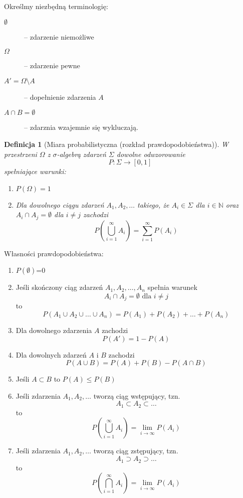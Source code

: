 \documentclass[11pt, leqno]{scrartcl}
\theoremstyle{mydefinition}
\newtheorem{definition}{Definicja}[subsection]
\theoremstyle{mytheorem}
\begin{document}
    Określmy niezbędną terminologię:
    \begin{description}
        \item[$\emptyset$] -- zdarzenie niemożliwe
        \item[$\Omega$] -- zdarzenie pewne
        \item[$A'=\Omega \setminus A$] -- dopełnienie zdarzenia $A$
        \item[$A \cap B= \emptyset$] -- zdarznia wzajemnie się
            wykluczają.
    \end{description}
    \begin{definition}[Miara probabilistyczna (rozkład
        prawdopodobieństwa)]
        W przestrzeni $\Omega$ z $\sigma$-algebrą zdarzeń $\Sigma$
        dowolne odwzorowanie
        \[
            P:\Sigma \to [0,1]
        \]
        spełniające warunki:
        \begin{enumerate}
            \item $P(\Omega)=1$
            \item Dla dowolnego ciągu zdarzeń $A_1,A_2,\ldots$ takiego,
                że $A_i \in \Sigma$ dla $i \in \mathbb{N}$ oraz
                $A_i \cap A_j=\emptyset$ dla $i \neq j$ zachodzi
                \[
                    P\left(\bigcup_{i=1}^{\infty}A_i\right)=
                    \sum_{i=1}^{\infty}P(A_i)
                \]
        \end{enumerate}
    \end{definition}
    Własności prawdopodobieństwa:
    \begin{enumerate}
        \item $P(\emptyset)$=0
        \item Jeśli skończony ciąg zdarzeń $A_1,A_2,\ldots,A_n$ spełnia
            warunek
            \[
                A_i \cap A_j = \emptyset \text{ dla }i \neq j
            \]
            to
            \[
                P(A_1 \cup A_2 \cup \ldots \cup A_n)=
                P(A_1)+P(A_2)+\ldots +P(A_n)
            \]
        \item Dla dowolnego zdarzenia $A$ zachodzi
            \[
                P(A')=1-P(A)
            \]
        \item Dla dowolnych zdarzeń $A$ i $B$ zachodzi
            \[
                P(A \cup B)=P(A)+P(B)-P(A \cap B)
            \]
        \item Jeśli $A \subset B$ to $P(A)\leq P(B)$
        \item Jeśli zdarzenia $A_1,A_2,\ldots$ tworzą ciąg
            wstępujący, tzn.
            \[
                A_1 \subset A_2 \subset \ldots
            \]
            to
            \[
                P\left( \bigcup_{i=1}^{\infty}A_i \right)=
                \lim_{i \to \infty}P(A_i)
            \]
        \item Jeśli zdarzenia $A_1,A_2,\ldots$ tworzą ciąg
            zstępujący, tzn.
            \[
                A_1 \supset A_2 \supset \ldots
            \]
            to
            \[
                P\left( \bigcap_{i=1}^{\infty}A_i \right)=
                \lim_{i \to \infty}P(A_i)
            \]
    \end{enumerate}
\end{document}
